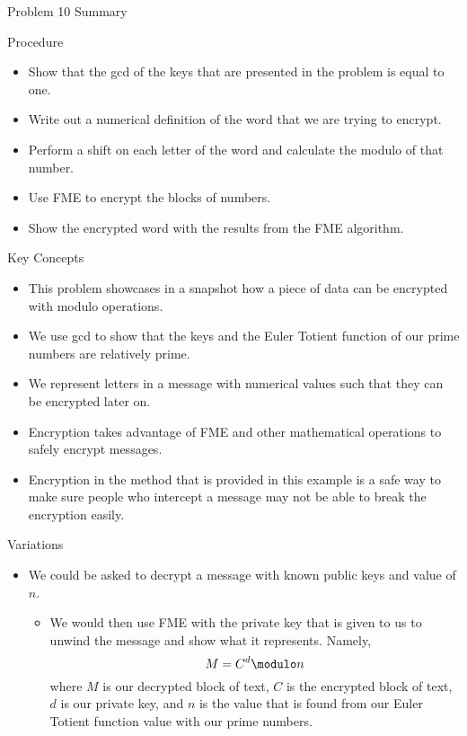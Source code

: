 \begin{summary}{Problem 10 Summary}
    \begin{statement}{Procedure}
        \begin{itemize}
            \item Show that the gcd of the keys that are presented in the problem is equal to one.
            \item Write out a numerical definition of the word that we are trying to encrypt.
            \item Perform a shift on each letter of the word and calculate the modulo of that number.
            \item Use FME to encrypt the blocks of numbers.
            \item Show the encrypted word with the results from the FME algorithm.
        \end{itemize}
    \end{statement}
    \begin{statement}{Key Concepts}
        \begin{itemize}
            \item This problem showcases in a snapshot how a piece of data can be encrypted with modulo operations.
            \item We use gcd to show that the keys and the Euler Totient function of our prime numbers are relatively prime.
            \item We represent letters in a message with numerical values such that they can be encrypted later on.
            \item Encryption takes advantage of FME and other mathematical operations to safely encrypt messages.
            \item Encryption in the method that is provided in this example is a safe way to make sure people who intercept a message may not be able to break the encryption easily.
        \end{itemize}
    \end{statement}
    \begin{statement}{Variations}
        \begin{itemize}
            \item We could be asked to decrypt a message with known public keys and value of $n$.
            \begin{itemize}
                \item We would then use FME with the private key that is given to us to unwind the message and show what it represents. Namely,
                \begin{equation*}
                    M = C^{d} \modulo n
                \end{equation*}
                where $M$ is our decrypted block of text, $C$ is the encrypted block of text, $d$ is our private key, and $n$ is the value that is found from our Euler Totient function value with our
                prime numbers.
            \end{itemize}
        \end{itemize}
    \end{statement}
\end{summary}